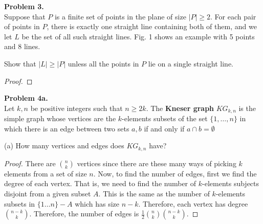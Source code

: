 \documentclass{article}
\newcommand{\set}[1]{\{#1\}}
\newenvironment{hwproof}[2]
{
    \textbf{Problem #1.}\\
    #2
    \begin{proof}
}{
    \end{proof}
    \newpage
}
\begin{document}
\begin{hwproof}
    {3}
    {
        Suppose that $P$ is a finite set of points in the plane of size $|P| \geq 2$. For each
        pair of points in $P$, there is exactly one straight line containing both of them,
        and we let $L$ be the set of all such straight lines. Fig. 1 shows an example with
        5 points and 8 lines.

        Show that $|L| \geq |P|$ unless all the points in $P$ lie on a single straight line.
    }

\end{hwproof}

\begin{hwproof}
    {4a}
    {
        Let $k, n$ be positive integers such that $n \geq 2k$. The \textbf{Kneser graph}
        $KG_{k,n}$ is the simple graph whose vertices are the $k$-elements subsets of
        the set $\set{1,\dots,n}$ in which there is an edge between two sets $a,b$
        if and only if $a\cap b = \emptyset$

        (a) How many vertices and edges does $KG_{k,n}$ have?
    }
    There are $\binom{n}{k}$ vertices since there are these many ways of picking $k$ elements
    from a set of size $n$. Now, to find the number of edges, first we find the degree of each
    vertex. That is, we need to find the number of $k$-elements subjects disjoint from a given
    subset $A$. This is the same as the number of $k$-elements subsets in
    $\set{1\dots n} - A$ which has size $n - k$. Therefore, each vertex has degree
    $\binom{n - k}{k}$. Therefore, the number of edges is
    $\frac{1}{2}\binom{n}{k}\binom{n - k}{k}$.
\end{hwproof}
\end{document}
